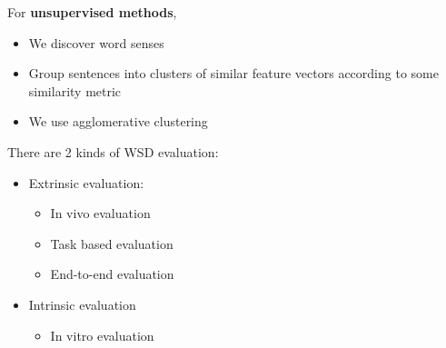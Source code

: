 \documentclass[12pt]{article}
\theoremstyle{definition}
\begin{document}
For \textbf{unsupervised methods},
\begin{itemize}
	\item We discover word senses
	\item Group sentences into clusters of similar feature vectors according to some similarity metric
	\item We use agglomerative clustering
\end{itemize}
There are 2 kinds of WSD evaluation:
\begin{itemize}
	\item Extrinsic evaluation:
	\begin{itemize}
		\item In vivo evaluation
		\item Task based evaluation
		\item End-to-end evaluation
	\end{itemize}
	\item Intrinsic evaluation
	\begin{itemize}
		\item In vitro evaluation
	\end{itemize}
\end{itemize}
\clearpage
\end{document}
